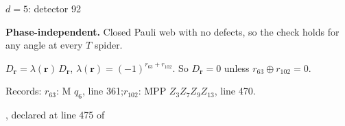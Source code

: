 \label{d5_det092}
{\Large $d=5$: detector 92}\par
\textbf{Phase-independent.} Closed Pauli web with no defects, so the check holds for any angle at every $T$ spider.
\begin{center}
\end{center}
\vspace{-1mm}
$D_{\boldsymbol r}=\lambda(\boldsymbol r)\,D_{\boldsymbol r}$, \quad $\lambda(\boldsymbol r)=(-1)^{r_{63}+r_{102}}$. \qquad So $D_{\boldsymbol r}=0$ unless $r_{63}\oplus r_{102}=0$.
\par\smallskip\begin{minipage}{.98\linewidth}\small Records: $r_{63}$: M $q_{6}$, line 361;\quad $r_{102}$: MPP $Z_{3}Z_{7}Z_{9}Z_{13}$, line 470.\end{minipage}
\vfill
{\footnotesize\texttt{}, declared at line 475 of \texttt{}}
\newpage

